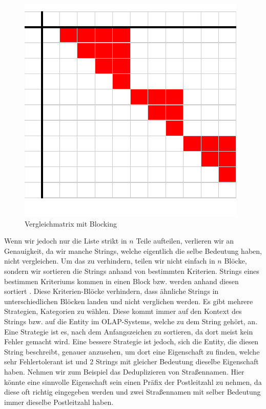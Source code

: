 \documentclass[sigconf]{acmart}
\begin{document}
\begin{figure}[htbp]
  \centering
  \includegraphics{table2.pdf}
  \caption{Vergleichmatrix mit Blocking}
  \label{abb:matrixblock}
\end{figure}

Wenn wir jedoch nur die Liste strikt in $n$
Teile aufteilen, verlieren wir an Genauigkeit, da wir
manche Strings, welche eigentlich die selbe Bedeutung haben,
nicht vergleichen.
Um das zu verhindern, teilen wir nicht einfach in $n$
Blöcke, sondern wir sortieren die Strings anhand von
bestimmten Kriterien. Strings eines bestimmen Kriteriums kommen
in einen Block bzw. werden anhand diesen sortiert \cite[Vlg. S. 11]{elmagarmid1}.
Diese Kriterien-Blöcke verhindern, dass
ähnliche Strings in unterschiedlichen Blöcken landen
und nicht verglichen werden.
Es gibt mehrere Strategien, Kategorien zu wählen. Diese
kommt immer auf den Kontext des Strings bzw. auf die Entity 
im OLAP-Systems, welche zu dem String gehört, an.
Eine Strategie ist es, nach dem Anfangszeichen zu
sortieren, da dort meist kein Fehler gemacht wird.
Eine bessere Strategie ist jedoch, sich die Entity,
die diesen String beschreibt, genauer anzusehen,
um dort eine Eigenschaft zu finden, welche sehr
Fehlertolerant ist und 2 Strings mit gleicher Bedeutung
dieselbe Eigenschaft haben.
Nehmen wir zum Beispiel das Deduplizieren von
Straßennamen. Hier könnte eine sinnvolle
Eigenschaft sein einen Präfix der
Postleitzahl zu nehmen, da diese oft richtig
eingegeben werden und zwei Straßennamen mit selber
Bedeutung immer dieselbe Postleitzahl haben.
\end{document}
